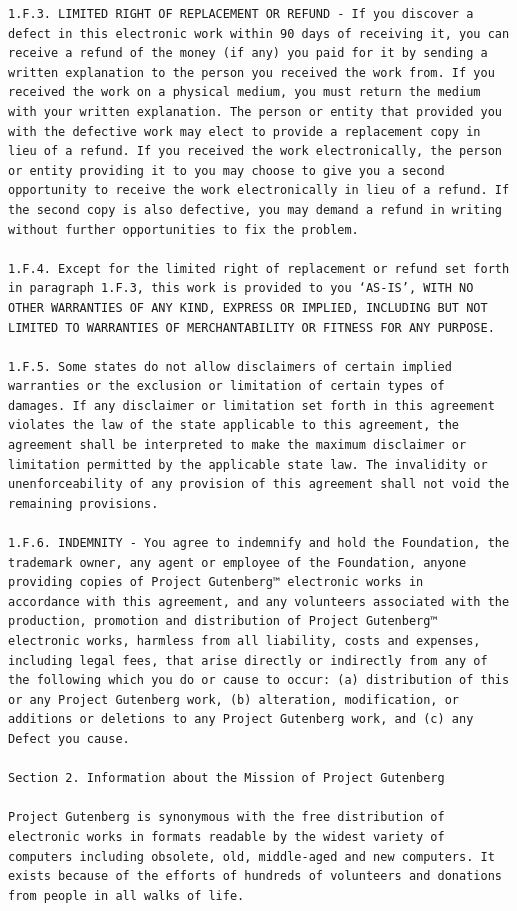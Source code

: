 \documentclass{article}
\begin{document}
\begin{verbatim}
1.F.3. LIMITED RIGHT OF REPLACEMENT OR REFUND - If you discover a
defect in this electronic work within 90 days of receiving it, you can
receive a refund of the money (if any) you paid for it by sending a
written explanation to the person you received the work from. If you
received the work on a physical medium, you must return the medium
with your written explanation. The person or entity that provided you
with the defective work may elect to provide a replacement copy in
lieu of a refund. If you received the work electronically, the person
or entity providing it to you may choose to give you a second
opportunity to receive the work electronically in lieu of a refund. If
the second copy is also defective, you may demand a refund in writing
without further opportunities to fix the problem.

1.F.4. Except for the limited right of replacement or refund set forth
in paragraph 1.F.3, this work is provided to you ‘AS-IS’, WITH NO
OTHER WARRANTIES OF ANY KIND, EXPRESS OR IMPLIED, INCLUDING BUT NOT
LIMITED TO WARRANTIES OF MERCHANTABILITY OR FITNESS FOR ANY PURPOSE.

1.F.5. Some states do not allow disclaimers of certain implied
warranties or the exclusion or limitation of certain types of
damages. If any disclaimer or limitation set forth in this agreement
violates the law of the state applicable to this agreement, the
agreement shall be interpreted to make the maximum disclaimer or
limitation permitted by the applicable state law. The invalidity or
unenforceability of any provision of this agreement shall not void the
remaining provisions.

1.F.6. INDEMNITY - You agree to indemnify and hold the Foundation, the
trademark owner, any agent or employee of the Foundation, anyone
providing copies of Project Gutenberg™ electronic works in
accordance with this agreement, and any volunteers associated with the
production, promotion and distribution of Project Gutenberg™
electronic works, harmless from all liability, costs and expenses,
including legal fees, that arise directly or indirectly from any of
the following which you do or cause to occur: (a) distribution of this
or any Project Gutenberg work, (b) alteration, modification, or
additions or deletions to any Project Gutenberg work, and (c) any
Defect you cause.

Section 2. Information about the Mission of Project Gutenberg

Project Gutenberg is synonymous with the free distribution of
electronic works in formats readable by the widest variety of
computers including obsolete, old, middle-aged and new computers. It
exists because of the efforts of hundreds of volunteers and donations
from people in all walks of life.


\end{verbatim}
\end{document}
